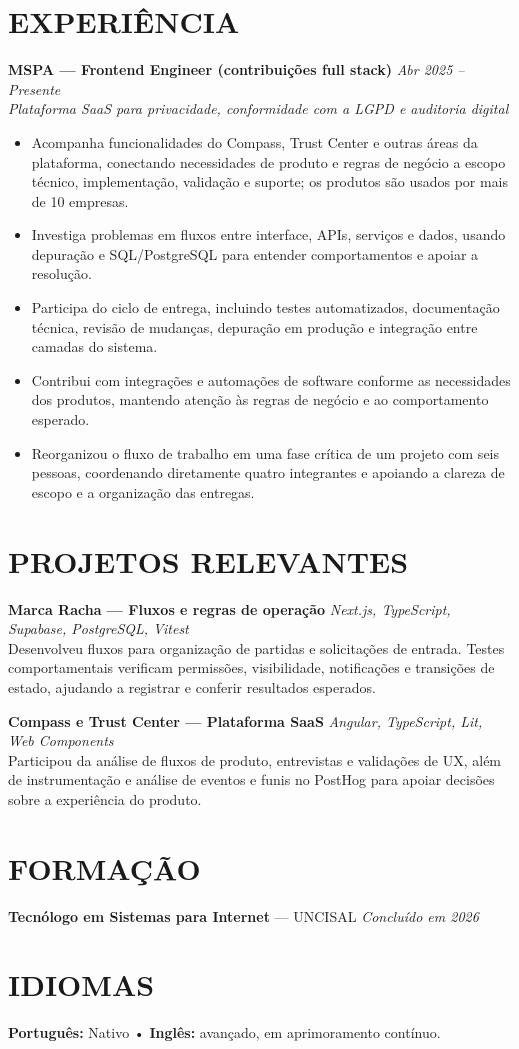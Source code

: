 \documentclass[10pt,a4paper]{article}
\begin{document}
\section*{EXPERIÊNCIA}
\textbf{MSPA — Frontend Engineer (contribuições full stack)} \hfill \textit{Abr 2025 -- Presente}\\
\textit{Plataforma SaaS para privacidade, conformidade com a LGPD e auditoria digital}
\begin{itemize}
    \item Acompanha funcionalidades do Compass, Trust Center e outras áreas da plataforma, conectando necessidades de produto e regras de negócio a escopo técnico, implementação, validação e suporte; os produtos são usados por mais de 10 empresas.
    \item Investiga problemas em fluxos entre interface, APIs, serviços e dados, usando depuração e SQL/PostgreSQL para entender comportamentos e apoiar a resolução.
    \item Participa do ciclo de entrega, incluindo testes automatizados, documentação técnica, revisão de mudanças, depuração em produção e integração entre camadas do sistema.
    \item Contribui com integrações e automações de software conforme as necessidades dos produtos, mantendo atenção às regras de negócio e ao comportamento esperado.
    \item Reorganizou o fluxo de trabalho em uma fase crítica de um projeto com seis pessoas, coordenando diretamente quatro integrantes e apoiando a clareza de escopo e a organização das entregas.
\end{itemize}

\section*{PROJETOS RELEVANTES}
\textbf{Marca Racha — Fluxos e regras de operação} \hfill \textit{Next.js, TypeScript, Supabase, PostgreSQL, Vitest}\\
Desenvolveu fluxos para organização de partidas e solicitações de entrada. Testes comportamentais verificam permissões, visibilidade, notificações e transições de estado, ajudando a registrar e conferir resultados esperados.

\vspace{2pt}
\textbf{Compass e Trust Center — Plataforma SaaS} \hfill \textit{Angular, TypeScript, Lit, Web Components}\\
Participou da análise de fluxos de produto, entrevistas e validações de UX, além de instrumentação e análise de eventos e funis no PostHog para apoiar decisões sobre a experiência do produto.

\section*{FORMAÇÃO}
\textbf{Tecnólogo em Sistemas para Internet} — UNCISAL \hfill \textit{Concluído em 2026}

\section*{IDIOMAS}
\textbf{Português:} Nativo \quad • \quad \textbf{Inglês:} avançado, em aprimoramento contínuo.
\end{document}
